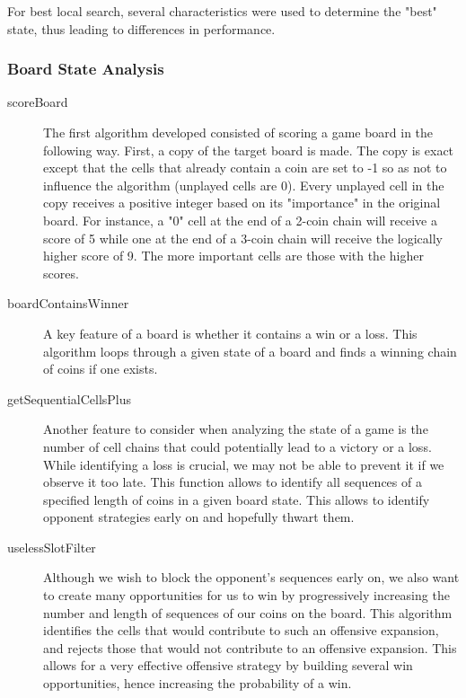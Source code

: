 \documentclass[11pt]{article}
\begin{document}
For best local search, several characteristics were used to determine the "best" state, thus leading to differences in performance. 

\subsubsection{Board State Analysis}
\begin{description}
\item[scoreBoard] The first algorithm developed consisted of scoring a game board in the following way. First, a copy of the target board is made. The copy is exact except that the cells that already contain a coin are set to -1 so as not to influence the algorithm (unplayed cells are 0). Every unplayed cell in the copy receives a positive integer based on its "importance" in the original board. For instance, a "0" cell at the end of a 2-coin chain will receive a score of 5 while one at the end of a 3-coin chain will receive the logically higher score of 9. The more important cells are those with the higher scores.

\item[boardContainsWinner] A key feature of a board is whether it contains a win or a loss. This algorithm loops through a given state of a board and finds a winning chain of coins if one exists.

\item[getSequentialCellsPlus] Another feature to consider when analyzing the state of a game is the number of cell chains that could potentially lead to a victory or a loss. While identifying a loss is crucial, we may not be able to prevent it if we observe it too late. This function allows to identify all sequences of a specified length of coins in a given board state. This allows to identify opponent strategies early on and hopefully thwart them.

\item[uselessSlotFilter] Although we wish to block the opponent's sequences early on, we also want to create many opportunities for us to win by progressively increasing the number and length of sequences of our coins on the board. This algorithm identifies the cells that would contribute to such an offensive expansion, and rejects those that would not contribute to an offensive expansion. This allows for a very effective offensive strategy by building several win opportunities, hence increasing the probability of a win.
\end{description} 
\end{document}
